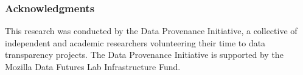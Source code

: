 \subsubsection*{Acknowledgments}
\label{sec:acknowledgements}
This research was conducted by the Data Provenance Initiative, a collective of independent and academic researchers volunteering their time to data transparency projects. The Data Provenance Initiative is supported by the Mozilla Data Futures Lab Infrastructure Fund.